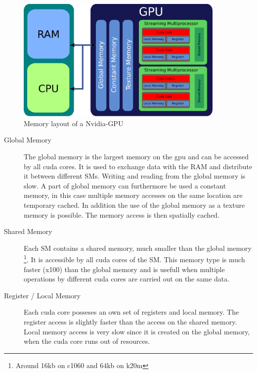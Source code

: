 \begin{figure}[!tbp]
      \centering
        \includegraphics[width=0.9\textwidth]{gfx/cuda/gpu.pdf}
          \caption{Memory layout of a Nvidia-GPU}
    \label{fig:gpu_grid}
\end{figure}

\begin{description}
    \item[Global Memory] The global memory is the largest memory on the gpu and can be accessed by all cuda cores.
                         It is  used to exchange data with the RAM and distribute it between different SMs.
                         Writing and reading from the global memory is slow. A part of global memory can furthermore be used a constant memory, in this case
                         multiple memory accesses on the same location are temporary cached.
                         In addition the use of the global memory as a texture memory is possible. The memory access is then spatially cached.


    \item[Shared Memory] Each SM contains a shared memory, much smaller than the global memory \footnote{Around 16kb on c1060 and 64kb on k20m}. It is accessible
                         by all cuda cores of the SM.
                         This memory type is much faster (x100) than the global memory and is usefull when multiple operations
                         by different cuda cores are carried out on the same data.

    \item[Register / Local Memory] Each cuda core posseses an own set of registers and local memory.
                                   The register access is slightly faster than the access  on the shared memory.
                                   Local memory access is very slow since
                                   it is created on the global memory, when the cuda core runs out of resources.
\end{description}

